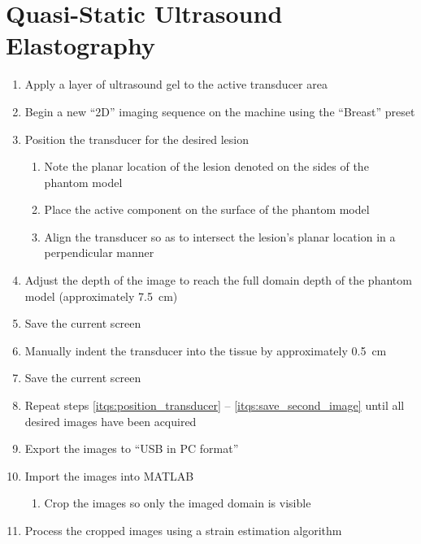	\section{Quasi-Static Ultrasound Elastography}
		\label{appsec:experimental_quasistatic}
		\begin{enumerate}
			\item Apply a layer of ultrasound gel to the active transducer area
			\item Begin a new ``2D'' imaging sequence on the machine using the ``Breast'' preset
			\item \label{itqs:position_transducer} Position the transducer for the desired lesion
			\begin{enumerate}
				\item Note the planar location of the lesion denoted on the sides of the phantom model
				\item Place the active component on the surface of the phantom model
				\item Align the transducer so as to intersect the lesion's planar location in a perpendicular manner
			\end{enumerate}
			\item Adjust the depth of the image to reach the full domain depth of the phantom model (approximately \SI{7.5}{\cm})
			\item Save the current screen
			\item Manually indent the transducer into the tissue by approximately \SI{0.5}{\cm}
			\item \label{itqs:save_second_image} Save the current screen
			\item Repeat steps \ref{itqs:position_transducer} -- \ref{itqs:save_second_image} until all desired images have been acquired
			\item Export the images to ``USB in PC format''
			\item Import the images into MATLAB\textsuperscript{\textregistered}
			\begin{enumerate}
				\item Crop the images so only the imaged domain is visible
			\end{enumerate}
			\item Process the cropped images using a strain estimation algorithm
		\end{enumerate}

